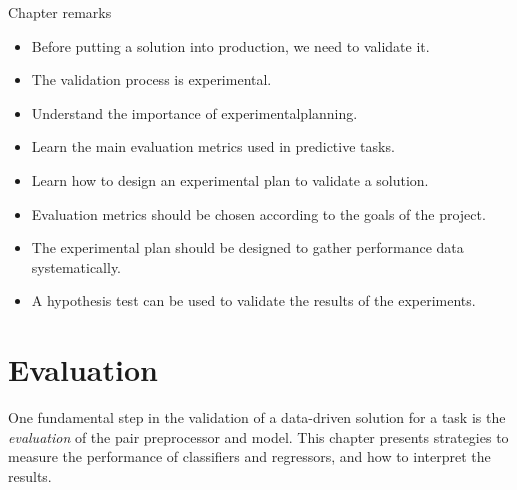 \begin{mainbox}{Chapter remarks}


  \startcontents[chapters]
  \vspace{1em}


  \begin{itemize}
    \itemsep0em
    \item Before putting a solution into production, we need to validate it.
    \item The validation process is experimental.
  \end{itemize}


  \begin{itemize}
    \itemsep0em
    \item Understand the importance of \gls{experimentalplanning}.
    \item Learn the main evaluation metrics used in predictive tasks.
    \item Learn how to design an experimental plan to validate a solution.
  \end{itemize}


  \begin{itemize}
    \itemsep0em
    \item Evaluation metrics should be chosen according to the goals of the project.
    \item The experimental plan should be designed to gather performance data
      systematically.
    \item A hypothesis test can be used to validate the results of the experiments.
  \end{itemize}
\end{mainbox}

{}
\clearpage

\section{Evaluation}
\label{sec:evaluation}

One fundamental step in the validation of a data-driven solution for a task is the
\emph{evaluation} of the pair \gls{preprocessor} and \gls{model}. This chapter presents strategies to
measure the performance of
\glspl{classifier} and \glspl{regressor}, and how to interpret the results.

